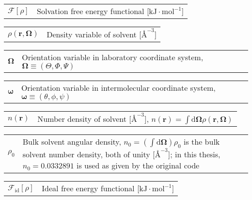 \hspace{-1.5em}%
\begin{tabular}{>{\raggedright}p{3.3em}l}
$\mathcal{F}[\rho]$ & Solvation free energy functional {[}$\mathrm{kJ\cdot mol^{-1}}${]}\tabularnewline
\end{tabular}

\hspace{-1.5em}%
\begin{tabular}{>{\raggedright}p{3.3em}l}
$\rho(\mathbf{r},\mathbf{\Omega})$ & Density variable of solvent {[}$\textrm{\AA}^{-3}${]}\tabularnewline
\end{tabular}

\hspace{-1.5em}%
\begin{tabular}{>{\raggedright}p{3.3em}l}
$\mathbf{\Omega}$ & Orientation variable in laboratory coordinate system, $\mathbf{\Omega}\equiv\left(\Theta,\Phi,\Psi\right)$\tabularnewline
\end{tabular}

\hspace{-1.5em}%
\begin{tabular}{>{\raggedright}p{3.3em}l}
$\boldsymbol{\omega}$ & Orientation variable in intermolecular coordinate system, $\boldsymbol{\omega}\equiv\left(\theta,\phi,\psi\right)$\tabularnewline
\end{tabular}

\hspace{-1.5em}%
\begin{tabular}{>{\raggedright}p{3.3em}l}
$n(\mathbf{r})$ & Number density of solvent {[}$\textrm{\AA}^{-3}${]}, $n(\mathbf{r})=\int\mathrm{d}\mathbf{\Omega}\rho(\mathbf{r},\mathbf{\Omega})$\tabularnewline
\end{tabular}

\hspace{-1.5em}%
\begin{tabular}{>{\raggedright}p{3.3em}>{\raggedright}p{}}
$\rho_{0}$ & Bulk solvent angular density, $n_{0}=\left(\int\mathrm{d}\mathbf{\Omega}\right)\rho_{\text{0}}$
is the bulk solvent number density, both of unity {[}$\mathrm{\textrm{\AA}^{-3}}${]};
in this thesis, $n_{0}=0.0332891$ is used as given by the original
code\tabularnewline
\end{tabular}

\hspace{-1.5em}%
\begin{tabular}{>{\raggedright}p{3.3em}l}
$\mathcal{F}_{\mathrm{id}}[\rho]$ & Ideal free energy functional {[}$\mathrm{kJ\cdot mol^{-1}}${]} \tabularnewline
\end{tabular}

